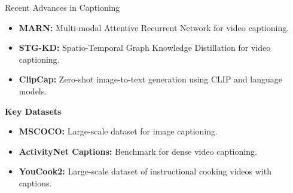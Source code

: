 \begin{frame}[allowframebreaks]{Recent Advances in Captioning}
        \begin{itemize}
            \item \textbf{MARN:} Multi-modal Attentive Recurrent Network for video captioning.
            \item \textbf{STG-KD:} Spatio-Temporal Graph Knowledge Distillation for video captioning.
            \item \textbf{ClipCap:} Zero-shot image-to-text generation using CLIP and language models.
        \end{itemize}
\framebreak
    \textbf{Key Datasets}
        \begin{itemize}
            \item \textbf{MSCOCO:} Large-scale dataset for image captioning.
            \item \textbf{ActivityNet Captions:} Benchmark for dense video captioning.
            \item \textbf{YouCook2:} Large-scale dataset of instructional cooking videos with captions.
        \end{itemize}
\end{frame}

